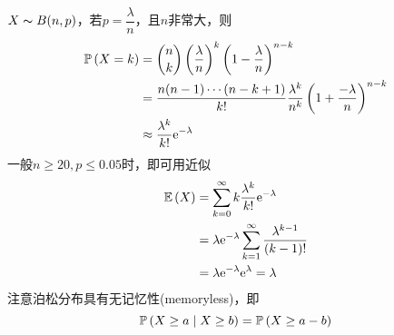 \begin{enumerate}
		$X\thicksim B(n,p)$，若$p=\dfrac{\lambda}{n}$，且$n$非常大，则
		\[\begin{aligned}
		\mathbb{P}\left(X=k\right) &= \binom{n}{k}\left(\frac{\lambda}{n}\right)^k\left(1-\frac{\lambda}{n}\right)^{n-k}\\
		&= \frac{n(n-1)\cdots(n-k+1)}{k!}\frac{\lambda^k}{n^k}\left(1+\frac{-\lambda}{n}\right)^{n-k}\\
		&\approx \frac{\lambda^k}{k!}\mathrm{e}^{-\lambda}
		\end{aligned}\]
		一般$n\geq 20,p\leq 0.05$时，即可用近似
		\[\begin{aligned}
		\mathbb{E}\left(X\right)&=\sum_{k=0}^\infty k\frac{\lambda^k}{k!}\mathrm{e}^{-\lambda}\\
		&=\lambda\mathrm{e}^{-\lambda}\sum_{k=1}^\infty\frac{\lambda^{k-1}}{(k-1)!}\\
		&=\lambda\mathrm{e}^{-\lambda}\mathrm{e}^{\lambda}=\lambda
		\end{aligned}\]
		注意泊松分布具有无记忆性(memoryless)，即
		\[\mathbb{P}\left(X\geq a\mid X\geq b\right)=\mathbb{P}\left(X\geq a-b\right)\]
\end{enumerate}

